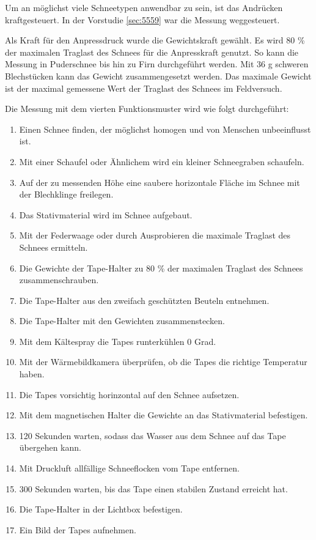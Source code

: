 

Um an möglichst viele Schneetypen anwendbar zu sein, ist das Andrücken kraftgesteuert. In der Vorstudie \ref{sec:5559} war die Messung weggesteuert.

Als Kraft für den Anpressdruck wurde die Gewichtskraft gewählt. Es wird 80 \% der maximalen Traglast des Schnees für die Anpresskraft genutzt. So kann die Messung in Puderschnee bis hin zu Firn durchgeführt werden. Mit 36 g schweren Blechstücken kann das Gewicht zusammengesetzt werden. Das maximale Gewicht ist der maximal gemessene Wert der Traglast des Schnees im Feldversuch.

Die Messung mit dem vierten Funktionsmuster wird wie folgt durchgeführt:

\begin{enumerate}
\item Einen Schnee finden, der möglichst homogen und von Menschen unbeeinflusst ist.
\item Mit einer Schaufel oder Ähnlichem wird ein kleiner Schneegraben schaufeln.
\item Auf der zu messenden Höhe eine saubere horizontale Fläche im Schnee mit der Blechklinge freilegen.
\item Das Stativmaterial wird im Schnee aufgebaut.
\item Mit der Federwaage oder durch Ausprobieren die maximale Traglast des Schnees ermitteln.
\item Die Gewichte der Tape-Halter zu 80 \% der maximalen Traglast des Schnees zusammenschrauben.
\item Die Tape-Halter aus den zweifach geschützten Beuteln entnehmen.
\item Die Tape-Halter mit den Gewichten zusammenstecken.
\item Mit dem Kältespray die Tapes runterkühlen 0 Grad.
\item Mit der Wärmebildkamera überprüfen, ob die Tapes die richtige Temperatur haben.
\item Die Tapes vorsichtig horinzontal auf den Schnee aufsetzen.
\item Mit dem magnetischen Halter die Gewichte an das Stativmaterial befestigen.
\item 120 Sekunden warten, sodass das Wasser aus dem Schnee auf das Tape übergehen kann.
\item Mit Druckluft allfällige Schneeflocken vom Tape entfernen.
\item 300 Sekunden warten, bis das Tape einen stabilen Zustand erreicht hat.
\item Die Tape-Halter in der Lichtbox befestigen.
\item Ein Bild der Tapes aufnehmen.
\end{enumerate}
